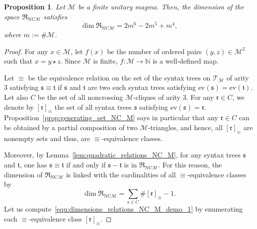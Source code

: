 \documentclass[10pt,reqno]{amsart}
\numberwithin{equation}{subsection}
\newtheorem{Proposition}[Theorem]{Proposition}
\newcommand{\N}{\mathbb{N}}
\newcommand{\Mca}{\mathcal{M}}
\newcommand{\Tfr}{\mathfrak{t}}
\newcommand{\Sfr}{\mathfrak{s}}
\newcommand{\Rfr}{\mathfrak{r}}
\newcommand{\NC}{\mathrm{NC}}
\newcommand{\Op}{\star}
\newcommand{\Rel}{\mathfrak{R}}
\newcommand{\Eval}{\mathrm{ev}}
\newcommand{\RelEq}{\equiv}
\newcommand{\Triangles}{\mathcal{T}}
\begin{document}
\begin{Proposition} \label{prop:dimensions_relations_NC_M}
    Let $\Mca$ be a finite unitary magma. Then, the dimension of the
    space $\Rel_{\NC\Mca}$ satisfies
    \begin{equation}
        \dim \Rel_{\NC\Mca} = 2m^6 - 2m^5 + m^4,
    \end{equation}
    where $m := \# \Mca$.
\end{Proposition}
\begin{proof}
    For any $x \in \Mca$, let $f(x)$ be the number of ordered pairs
    $(y, z) \in \Mca^2$ such that $x = y \Op z$. Since $\Mca$ is finite,
    $f : \Mca \to \N$ is a well-defined map.
    \smallskip

    Let $\RelEq$ be the equivalence relation on the set of the syntax
    trees on $\Triangles_\Mca$ of arity $3$ satisfying
    $\Sfr \RelEq \Tfr$ if $\Sfr$ and $\Tfr$ are two such syntax trees
    satisfying $\Eval(\Sfr) = \Eval(\Tfr)$. Let also $C$ be the set of
    all noncrossing $\Mca$-cliques of arity $3$. For any $\Rfr \in C$,
    we denote by $[\Rfr]_\RelEq$ the set of all syntax trees $\Sfr$
    satisfying $\Eval(\Sfr) = \Rfr$.
    Proposition~\ref{prop:generating_set_NC_M} says in particular that
    any $\Rfr \in C$ can be obtained by a partial composition of two
    $\Mca$-triangles, and hence, all $[\Rfr]_\RelEq$ are nonempty sets
    and thus, are $\RelEq$-equivalence classes.
    \smallskip

    Moreover, by Lemma~\ref{lem:quadratic_relations_NC_M}, for any
    syntax trees $\Sfr$ and $\Tfr$, one has $\Sfr \RelEq \Tfr$ if and
    only if $\Sfr - \Tfr$ is in $\Rel_{\NC\Mca}$. For this reason, the
    dimension of $\Rel_{\NC\Mca}$ is linked with the cardinalities of
    all $\RelEq$-equivalence classes by
    \begin{equation} \label{equ:dimensions_relations_NC_M_demo_1}
        \dim \Rel_{\NC\Mca} =
        \sum_{\Rfr \in C} \# [\Rfr]_\RelEq - 1.
    \end{equation}
    Let us compute~\eqref{equ:dimensions_relations_NC_M_demo_1} by
    enumerating each $\RelEq$-equivalence class $[\Rfr]_\RelEq$.
    \smallskip


\end{proof}
\end{document}
